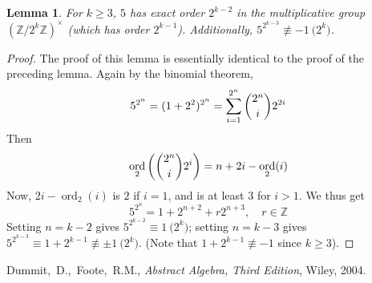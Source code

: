 \documentclass[12pt]{article}
\newcommand{\Ints}{\mathbb{Z}}
\DeclareMathOperator{\ord}{ord}
\newcommand{\UI}[1]{(\Ints/{#1}\Ints)^{\times}}
\newtheorem{lem}[thm]{Lemma}
\begin{document}
\begin{lem} \label{lem:four} For $k\geq 3$, $5$ has exact order $2^{k-2}$ in the multiplicative group $\UI{2^k}$ (which has order $2^{k-1}$). Additionally, $5^{2^{k-3}}\not\equiv -1\pod{2^{k}}$.
\end{lem}
\begin{proof}
The proof of this lemma is essentially identical to the proof of the preceding lemma.
Again by the binomial theorem,
\[
  5^{2^n} = (1+2^2)^{2^n} = \sum_{i=1}^{2^n}\dbinom{2^n}{i}2^{2i}
\]
Then
\[
  \ord_2\left(\dbinom{2^n}{i}2^i\right) = n+2i-\ord_2(i)
\]
Now, $2i-\ord_2(i)$ is $2$ if $i=1$, and is at least $3$ for $i>1$. We thus get
\[
  5^{2^n} = 1 + 2^{n+2} + r2^{n+3},\quad r\in\Ints
\]
Setting $n=k-2$ gives $5^{2^{k-2}}\equiv 1\pod{2^{k}}$; setting $n=k-3$ gives $5^{2^{k-3}}\equiv 1+2^{k-1}\not\equiv \pm 1\pod{2^{k}}$. (Note that $1+2^{k-1}\not\equiv -1$ since $k\geq 3$).
\end{proof}
\begin{thebibliography}{10}
Dummit,~D.,~Foote,~R.M., \emph{Abstract Algebra, Third Edition}, Wiley, 2004.
\end{thebibliography}
\end{document}
